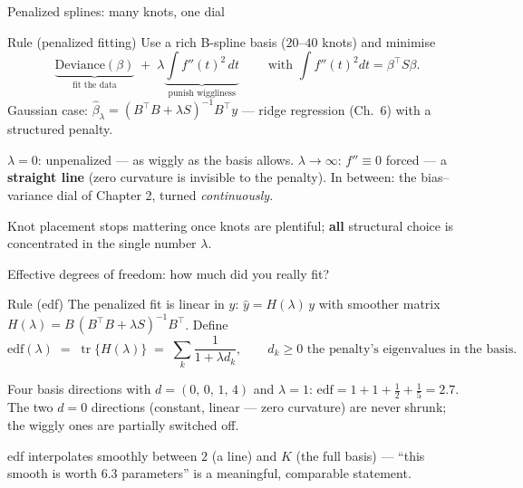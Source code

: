 \documentclass[aspectratio=169,11pt]{beamer}
\begin{document}
\begin{frame}{Penalized splines: many knots, one dial}
  \footnotesize
  \begin{block}{Rule (penalized fitting)}
    \footnotesize
    Use a rich B-spline basis ($20$--$40$ knots) and minimise
    \[
      \boxed{\;\underbrace{\text{Deviance}(\beta)}_{\text{fit the data}}
      \;+\; \lambda \underbrace{\int f''(t)^2\, dt}_{\text{punish wiggliness}}\;}
      \qquad\text{with } \int f''(t)^2 dt = \beta^{\top} S \beta .
    \]
    Gaussian case: $\hat\beta_\lambda = (B^{\top}B + \lambda S)^{-1} B^{\top} y$ ---
    ridge regression (Ch.\ 6) with a structured penalty.
  \end{block}
  \begin{readme}
    $\lambda = 0$: unpenalized --- as wiggly as the basis allows.
    \;$\lambda \to \infty$: $f''\equiv 0$ forced --- a \textbf{straight line} (zero
    curvature is invisible to the penalty).
    \;In between: the bias--variance dial of Chapter 2, turned \emph{continuously}.
  \end{readme}
  \begin{takeaway}
    Knot placement stops mattering once knots are plentiful; \textbf{all} structural
    choice is concentrated in the single number $\lambda$.
  \end{takeaway}
\end{frame}

\begin{frame}{Effective degrees of freedom: how much did you really fit?}
  \footnotesize
  \begin{block}{Rule (edf)}
    \footnotesize
    The penalized fit is linear in $y$: $\hat y = H(\lambda)\, y$ with smoother matrix
    $H(\lambda) = B\,(B^{\top}B + \lambda S)^{-1} B^{\top}$. Define
    \[
      \text{edf}(\lambda) \;=\; \operatorname{tr}\{H(\lambda)\}
      \;=\; \sum_{k} \frac{1}{1 + \lambda d_k},
      \qquad d_k \ge 0 \text{ the penalty's eigenvalues in the basis.}
    \]
  \end{block}
  \begin{numexample}
    Four basis directions with $d = (0,\, 0,\, 1,\, 4)$ and $\lambda = 1$:
    $\text{edf} = 1 + 1 + \tfrac{1}{2} + \tfrac{1}{5} = \mathbf{2.7}$. The two $d=0$
    directions (constant, linear --- zero curvature) are never shrunk; the wiggly ones
    are partially switched off.
  \end{numexample}
  \begin{takeaway}
    edf interpolates smoothly between $2$ (a line) and $K$ (the full basis) --- ``this
    smooth is worth $6.3$ parameters'' is a meaningful, comparable statement.
  \end{takeaway}
\end{frame}
\end{document}
